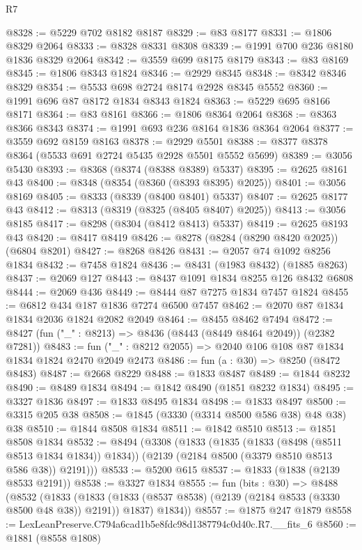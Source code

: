 \begin{lexlean}{R7}
\begin{coremodule}
@8328 := @5229 @702 @8182 @8187
@8329 := @83 @8177
@8331 := @1806 @8329 @2064
@8333 := @8328 @8331 @8308
@8339 := @1991 @700 @236 @8180 @1836 @8329 @2064
@8342 := @3559 @699 @8175 @8179
@8343 := @83 @8169
@8345 := @1806 @8343 @1824
@8346 := @2929 @8345
@8348 := @8342 @8346 @8329
@8354 := @5533 @698 @2724 @8174 @2928 @8345 @5552
@8360 := @1991 @696 @87 @8172 @1834 @8343 @1824
@8363 := @5229 @695 @8166 @8171
@8364 := @83 @8161
@8366 := @1806 @8364 @2064
@8368 := @8363 @8366 @8343
@8374 := @1991 @693 @236 @8164 @1836 @8364 @2064
@8377 := @3559 @692 @8159 @8163
@8378 := @2929 @5501
@8388 := @8377 @8378 @8364 (@5533 @691 @2724 @5435 @2928 @5501 @5552 @5699)
@8389 := @3056 @5430
@8393 := @8368 (@8374 (@8388 @8389) @5337)
@8395 := @2625 @8161 @43
@8400 := @8348 (@8354 (@8360 (@8393 @8395) @2025))
@8401 := @3056 @8169
@8405 := @8333 (@8339 (@8400 @8401) @5337)
@8407 := @2625 @8177 @43
@8412 := @8313 (@8319 (@8325 (@8405 @8407) @2025))
@8413 := @3056 @8185
@8417 := @8298 (@8304 (@8412 @8413) @5337)
@8419 := @2625 @8193 @43
@8420 := @8417 @8419
@8426 := @8278 (@8284 (@8290 @8420 @2025)) (@6804 @8201)
@8427 := @8268 @8426
@8431 := @2057 @74 @1092 @8256 @1834
@8432 := @7458 @1824
@8436 := @8431 (@1983 @8432) (@1885 @8263)
@8437 := @2069 @127
@8443 := @8437 @1091 @1834 @8255 @126 @8432 @6808
@8444 := @2069 @436
@8449 := @8444 @87 @7275 @1834 @7457 @1824
@8455 := @6812 @434 @187 @1836 @7274 @6500 @7457
@8462 := @2070 @87 @1834 @1834 @2036 @1824 @2082 @2049
@8464 := @8455 @8462 @7494
@8472 := @8427 (fun ("_" : @8213) => @8436 (@8443 (@8449 @8464 @2049)) (@2382 @7281))
@8483 := fun ("_" : @8212 @2055) => @2040 @106 @108 @87 @1834 @1834 @1824 @2470 @2049 @2473
@8486 := fun (a : @30) => @8250 (@8472 @8483)
@8487 := @2668 @8229
@8488 := @1833 @8487
@8489 := @1844 @8232
@8490 := @8489 @1834
@8494 := @1842 @8490 (@1851 @8232 @1834)
@8495 := @3327 @1836
@8497 := @1833 @8495 @1834
@8498 := @1833 @8497
@8500 := @3315 @205 @38
@8508 := @1845 (@3330 (@3314 @8500 @586 @38) @48 @38) @38
@8510 := @1844 @8508 @1834
@8511 := @1842 @8510
@8513 := @1851 @8508 @1834
@8532 := @8494
    (@3308
      (@1833
        (@1835 (@1833 (@8498 (@8511 @8513 @1834 @1834)) @1834))
        (@2139 (@2184 @8500 (@3379 @8510 @8513 @586 @38)) @2191)))
@8533 := @5200 @615
@8537 := @1833 (@1838 (@2139 @8533 @2191))
@8538 := @3327 @1834
@8555 := fun (bits : @30) =>
  @8488
    (@8532
      (@1833
        (@1833 (@1833 (@8537 @8538) (@2139 (@2184 @8533 (@3330 @8500 @48 @38)) @2191)) @1837)
        @1834))
@8557 := @1875 @247 @1879
@8558 := LexLeanPreserve.C794a6cad1b5e8fdc98d1387794c0d40c.R7.__fits_6
@8560 := @1881 (@8558 @1808)

\end{coremodule}
\end{lexlean}
